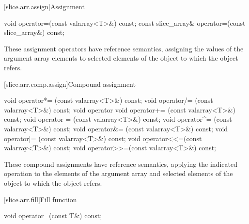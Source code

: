[slice.arr.assign]{Assignment}

%
\begin{itemdecl}
void operator=(const valarray<T>&) const;
const slice_array& operator=(const slice_array&) const;
\end{itemdecl}

\begin{itemdescr}
\pnum
These assignment operators have reference semantics,
assigning the values of the argument array elements to selected
elements of the
object to which the
object refers.
\end{itemdescr}

[slice.arr.comp.assign]{Compound assignment}

%
%
%
%
%
%
%
%
%
%
\begin{itemdecl}
void operator*= (const valarray<T>&) const;
void operator/= (const valarray<T>&) const;
void operator%
void operator+= (const valarray<T>&) const;
void operator-= (const valarray<T>&) const;
void operator^= (const valarray<T>&) const;
void operator&= (const valarray<T>&) const;
void operator|= (const valarray<T>&) const;
void operator<<=(const valarray<T>&) const;
void operator>>=(const valarray<T>&) const;
\end{itemdecl}

\begin{itemdescr}
\pnum
These compound assignments have reference semantics, applying the
indicated operation to the elements of the argument array
and selected elements of the
object to which the
object refers.
\end{itemdescr}

[slice.arr.fill]{Fill function}

%
\begin{itemdecl}
void operator=(const T&) const;
\end{itemdecl}

